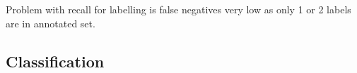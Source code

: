 %
%
%

Problem with recall for labelling is false negatives very low as only 1 or 2 labels are in annotated set. 


\subsection{Classification}

